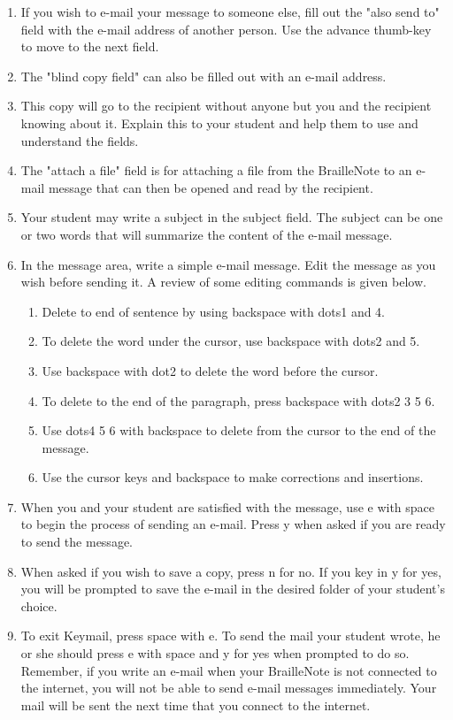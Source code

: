 \documentclass[10pt,letterpaper,twoside]{report}
\begin{document}
{{{\begin{enumerate}
	\item If you wish to e-mail your message to someone else, fill out the "also send to" field with the e-mail address of another person.  Use the advance thumb-key to move to the next field.
	\item The "blind copy field" can also be filled out with an e-mail address.
	\item This copy will go to the recipient without anyone but you and the recipient knowing about it.  Explain this to your student and help them to use and understand the fields.
	\item The "attach a file" field is for attaching a file from the BrailleNote to an e-mail message that can then be opened and read by the recipient.
	\item Your student may write a subject in the subject field.  The subject can be one or two words that will summarize the content of the e-mail message.
	\item In the message area, write a simple e-mail message.  Edit the message as you wish before sending it.  A review of some editing commands is given below.
	      \begin{enumerate}
		      \item Delete to end of sentence by using backspace with dots1 and 4.
		      \item To delete the word under the cursor, use backspace with dots2 and 5.
		      \item Use backspace with dot2 to delete the word before the cursor.
		      \item To delete to the end of the paragraph, press backspace with dots2 3 5 6.
		      \item Use dots4 5 6 with backspace to delete from the cursor to the end of the message.
		      \item Use the cursor keys and backspace to make corrections and insertions.
	      \end{enumerate}
	\item When you and your student are satisfied with the message, use e with space to begin the process of sending an e-mail.  Press y when asked if you are ready to send the message.
	\item When asked if you wish to save a copy, press n for no.  If you key in y for yes, you will be prompted to save the e-mail in the desired folder of your student's choice.
	\item To exit Keymail, press space with e.  To send the mail your student wrote, he or she should press e with space and y for yes when prompted to do so.  Remember, if you write an e-mail when your BrailleNote is not connected to the internet, you will not be able to send e-mail messages immediately.  Your mail will be sent the next time that you connect to the internet.

\end{enumerate}}}}
\end{document}
